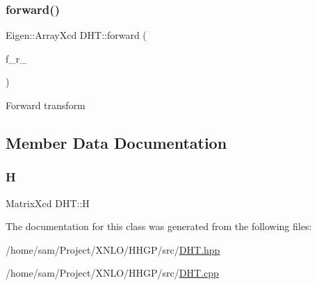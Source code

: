\subsubsection{\texorpdfstring{forward()}{forward()}}
{\footnotesize\ttfamily Eigen\+::\+Array\+Xcd D\+H\+T\+::forward (\begin{DoxyParamCaption}\item[{Eigen\+::\+Array\+Xcd}]{f\+\_\+r\+\_\+ }\end{DoxyParamCaption})}

Forward transform 

\subsection{Member Data Documentation}
\mbox{\label{class_d_h_t_ac17a580b606f25c937dbdc81dba517d7}} 
\subsubsection{\texorpdfstring{H}{H}}
{\footnotesize\ttfamily Matrix\+Xcd D\+H\+T\+::H\hspace{0.3cm}{\ttfamily [private]}}



The documentation for this class was generated from the following files\+:\begin{DoxyCompactItemize}
\item 
/home/sam/\+Project/\+X\+N\+L\+O/\+H\+H\+G\+P/src/\hyperlink{_d_h_t_8hpp}{D\+H\+T.\+hpp}\item 
/home/sam/\+Project/\+X\+N\+L\+O/\+H\+H\+G\+P/src/\hyperlink{_d_h_t_8cpp}{D\+H\+T.\+cpp}\end{DoxyCompactItemize}
